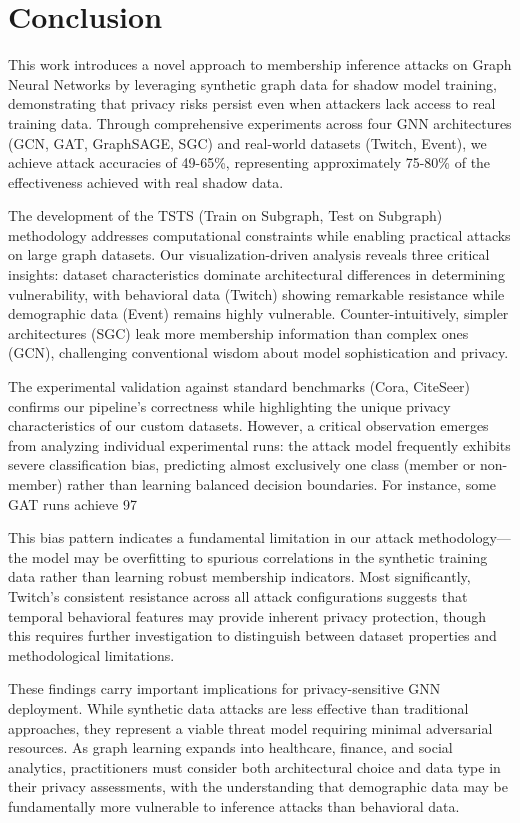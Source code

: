 \documentclass{article}
\begin{document}
\section{Conclusion}
This work introduces a novel approach to membership inference attacks on Graph Neural Networks by leveraging synthetic graph data for shadow model training, demonstrating that privacy risks persist even when attackers lack access to real training data. Through comprehensive experiments across four GNN architectures (GCN, GAT, GraphSAGE, SGC) and real-world datasets (Twitch, Event), we achieve attack accuracies of 49-65\%, representing approximately 75-80\% of the effectiveness achieved with real shadow data.

The development of the TSTS (Train on Subgraph, Test on Subgraph) methodology addresses computational constraints while enabling practical attacks on large graph datasets. Our visualization-driven analysis reveals three critical insights: dataset characteristics dominate architectural differences in determining vulnerability, with behavioral data (Twitch) showing remarkable resistance while demographic data (Event) remains highly vulnerable. Counter-intuitively, simpler architectures (SGC) leak more membership information than complex ones (GCN), challenging conventional wisdom about model sophistication and privacy.

The experimental validation against standard benchmarks (Cora, CiteSeer) confirms our pipeline's correctness while highlighting the unique privacy characteristics of our custom datasets. However, a critical observation emerges from analyzing individual experimental runs: the attack model frequently exhibits severe classification bias, predicting almost exclusively one class (member or non-member) rather than learning balanced decision boundaries. For instance, some GAT runs achieve 97%

This bias pattern indicates a fundamental limitation in our attack methodology—the model may be overfitting to spurious correlations in the synthetic training data rather than learning robust membership indicators. Most significantly, Twitch's consistent resistance across all attack configurations suggests that temporal behavioral features may provide inherent privacy protection, though this requires further investigation to distinguish between dataset properties and methodological limitations.

These findings carry important implications for privacy-sensitive GNN deployment. While synthetic data attacks are less effective than traditional approaches, they represent a viable threat model requiring minimal adversarial resources. As graph learning expands into healthcare, finance, and social analytics, practitioners must consider both architectural choice and data type in their privacy assessments, with the understanding that demographic data may be fundamentally more vulnerable to inference attacks than behavioral data.




\end{document}

